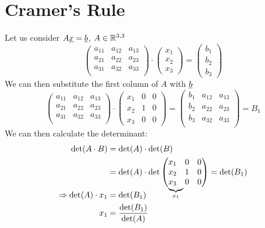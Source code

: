 \section{Cramer's Rule}
Let us consider $A\underline{x} = \underline{b}$, $A\in\mathbb{R}^{3,3}$
\[
\begin{pmatrix}
a_{11} & a_{12} & a_{13}\\
a_{21} & a_{22} & a_{23}\\
a_{31} & a_{32} & a_{33}\\
\end{pmatrix}\cdot \begin{pmatrix}
x_1\\
x_2\\
x_3
\end{pmatrix} = \begin{pmatrix}
b_1\\
b_2\\
b_3
\end{pmatrix}
\]
We can then substitute the first column of $A$ with $\underline{b}$
\[
\begin{pmatrix}
a_{11} & a_{12} & a_{13}\\
a_{21} & a_{22} & a_{23}\\
a_{31} & a_{32} & a_{33}\\
\end{pmatrix}\cdot \begin{pmatrix}
x_1 & 0 & 0\\
x_2 & 1 & 0\\
x_3 & 0 & 0
\end{pmatrix} = \begin{pmatrix}
b_{1} & a_{12} & a_{13}\\
b_{2} & a_{22} & a_{23}\\
b_{3} & a_{32} & a_{33}\\
\end{pmatrix} = B_1
\]
We can then calculate the determinant:
\begin{align*}
\det(A\cdot B) &= \det(A)\cdot \det(B)\\
&= \det(A) \cdot \det\begin{pmatrix}
x_1 & 0 & 0\\
x_2 & 1 & 0\\
\undermat{x_1}{x_3} & 0 & 0
\end{pmatrix} = \det(B_1)\\
\Rightarrow \det(A)\cdot x_1 &= \det(B_1)\\
x_1 &=\frac{\det(B_1)}{\det(A)}
\end{align*}

